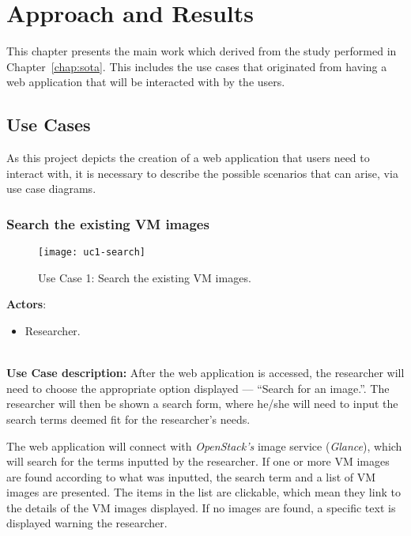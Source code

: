 \chapter{Approach and Results}\label{chap:chap4}


This chapter presents the main work which derived from the study performed in Chapter~\ref{chap:sota}. This includes the use cases that originated from having a web application that will be interacted with by the users. 

\section{Use Cases}\label{sec:use-cases}

As this project depicts the creation of a web application that users need to interact with, it is necessary to describe the possible scenarios that can arise, via use case diagrams.

\subsection{Search the existing VM images}\label{subsec:uc1}

\begin{figure}[h!]
  \begin{center}
    \leavevmode 
    \texttt{[image: uc1-search]}
    \caption{Use Case 1: Search the existing VM images.}
    \label{fig:uc1-search}
  \end{center}
\end{figure}


\textbf{Actors}:

\begin{itemize}
\item Researcher.
\end{itemize}\ \\
\textbf{Use Case description:} After the web application is accessed, the researcher will need to choose the appropriate option displayed --- ``Search for an image.''. The researcher will then be shown a search form, where he/she will need to input the search terms deemed fit for the researcher's needs.

The web application will connect with \textit{OpenStack's} image service (\textit{Glance}), which will search for the terms inputted by the researcher.
If one or more VM images are found according to what was inputted, the search term and a list of VM images are presented. The items in the list are clickable, which mean they link to the details of the VM images displayed.
If no images are found, a specific text is displayed warning the researcher.

